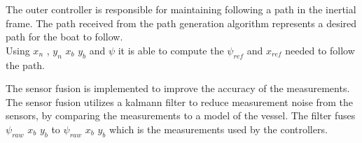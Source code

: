 The outer controller is responsible for maintaining following a path in the inertial frame. 
The path received from the path generation algorithm represents a desired path for the boat to follow. \\

Using $x_{n}$ , $y_{n}$ $x_b$ $y_b$ and $\psi$ it is able to compute the $\psi_{ref}$ and $x_{ref}$ needed to follow the path. 

The sensor fusion is implemented to improve the accuracy of the measurements. 
The sensor fusion utilizes a kalmann filter to reduce measurement noise from the sensors, by comparing the measurements to a model of the vessel. 
The filter fuses $\psi_{raw}$ $x_{b}$ $y_{b}$ to $\psi_{raw}$ $x_{b}$ $y_{b}$ which is the measurements used by the controllers. 

